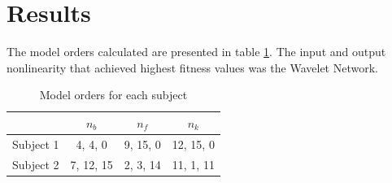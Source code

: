 \documentclass[letterpaper, 10 pt, conference]{ieeeconf}  %
\begin{document}





\section{Results}

The model orders calculated are presented in table \ref{ta:order}. The input and output nonlinearity that achieved highest fitness values was the Wavelet Network.

\begin{table}[h]
\caption{Model orders for each subject}
\label{ta:order}
\centering
\begin{tabular}{|c|c|c|c|}
\hline
 & \(n_b\) & \(n_f\) & \(n_k\)\\
\hline \hline
Subject 1 & 4, 4, 0 & 9, 15, 0 & 12, 15, 0\\
\hline
Subject 2 & 7, 12, 15 & 2, 3, 14 & 11, 1, 11\\
\hline
\end{tabular}
\end{table}
\end{document}
